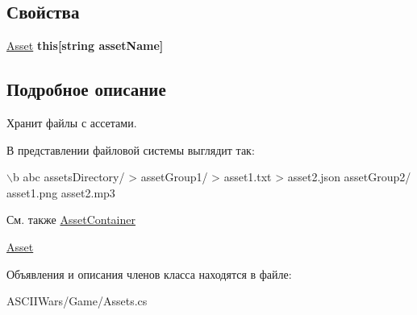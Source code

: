 \subsection*{Свойства}
\begin{DoxyCompactItemize}
\item 
\hypertarget{class_a_s_c_i_i_wars_1_1_game_1_1_asset_group_ada6ec78bb13c41b4f8309f91b4adeecc}{}\label{class_a_s_c_i_i_wars_1_1_game_1_1_asset_group_ada6ec78bb13c41b4f8309f91b4adeecc} 
\hyperlink{class_a_s_c_i_i_wars_1_1_game_1_1_asset}{Asset} {\bfseries this\mbox{[}string asset\+Name\mbox{]}}
\end{DoxyCompactItemize}


\subsection{Подробное описание}
Хранит файлы с ассетами. 

В представлении файловой системы выглядит так\+: 
\begin{DoxyCode}
\(\backslash\)b abc
assetsDirectory/
>     assetGroup1/
>         asset1.txt
>         asset2.json
    assetGroup2/
        asset1.png
        asset2.mp3
\end{DoxyCode}


\begin{DoxySeeAlso}{См. также}
\hyperlink{class_a_s_c_i_i_wars_1_1_game_1_1_asset_container}{Asset\+Container} 

\hyperlink{class_a_s_c_i_i_wars_1_1_game_1_1_asset}{Asset} 
\end{DoxySeeAlso}


Объявления и описания членов класса находятся в файле\+:\begin{DoxyCompactItemize}
\item 
A\+S\+C\+I\+I\+Wars/\+Game/Assets.\+cs\end{DoxyCompactItemize}
